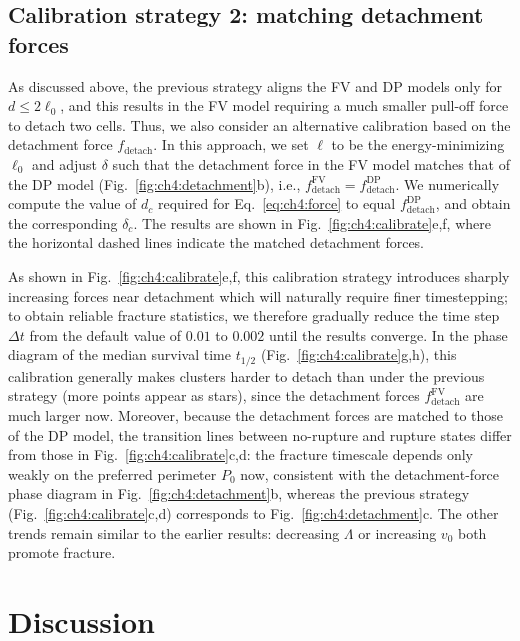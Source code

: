 \subsection{Calibration strategy 2: matching detachment forces}
\label{sec:ch4:cal2}

As discussed above, the previous strategy aligns the FV and DP models only for $d\leqslant 2\ell_0$, and this results in the FV model requiring a much smaller pull-off force to detach two cells.
Thus, we also consider an alternative calibration based on the detachment force $f_\textrm{detach}$.
In this approach, we set $\ell$ to be the energy-minimizing $\ell_0$ and adjust $\delta$ such that the detachment force in the FV model matches that of the DP model (Fig.~\ref{fig:ch4:detachment}b), i.e., $f_\textrm{detach}^\textrm{FV}=f_\textrm{detach}^\textrm{DP}$.
We numerically compute the value of $d_c$ required for Eq.~\eqref{eq:ch4:force} to equal $f_\textrm{detach}^\textrm{DP}$, and obtain the corresponding $\delta_c$. The results are shown in Fig.~\ref{fig:ch4:calibrate}e,f, where the horizontal dashed lines indicate the matched detachment forces.

As shown in Fig.~\ref{fig:ch4:calibrate}e,f, this calibration strategy introduces sharply increasing forces near detachment which will naturally require finer timestepping; to obtain reliable fracture statistics, we therefore gradually reduce the time step $\Delta t$ from the default value of $0.01$ to $0.002$ until the results converge.
In the phase diagram of the median survival time $t_{1/2}$ (Fig.~\ref{fig:ch4:calibrate}g,h), this calibration generally makes clusters harder to detach than under the previous strategy (more points appear as stars), since the detachment forces $f_\textrm{detach}^\textrm{FV}$ are much larger now.
Moreover, because the detachment forces are matched to those of the DP model, the transition lines between no-rupture and rupture states differ from those in Fig.~\ref{fig:ch4:calibrate}c,d: the fracture timescale depends only weakly on the preferred perimeter $P_0$ now, consistent with the detachment-force phase diagram in Fig.~\ref{fig:ch4:detachment}b, whereas the previous strategy (Fig.~\ref{fig:ch4:calibrate}c,d) corresponds to Fig.~\ref{fig:ch4:detachment}c.
The other trends remain similar to the earlier results: decreasing $\Lambda$ or increasing $v_0$ both promote fracture.


\section{Discussion}
\label{sec:ch4:discussion}

